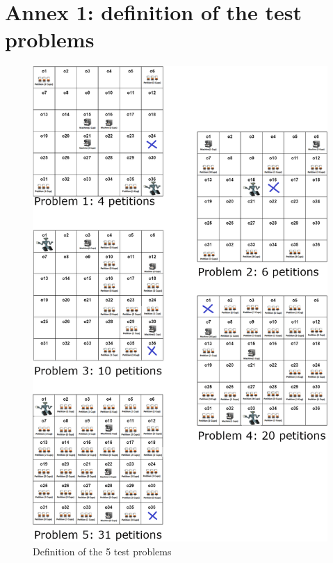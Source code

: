 \documentclass[12pt,a4paper,oneside]{article}
\numberwithin{equation}{section}
\numberwithin{equation}{section}
\theoremstyle{definition}
\begin{document}
\section{Annex 1: definition of the test problems}
\begin{figure}[!h]
	\centering
	\includegraphics[scale=0.5]{figures/problems.png}
	\caption{Definition of the 5 test problems}
	\label{problems} 
\end{figure}
\end{document}
